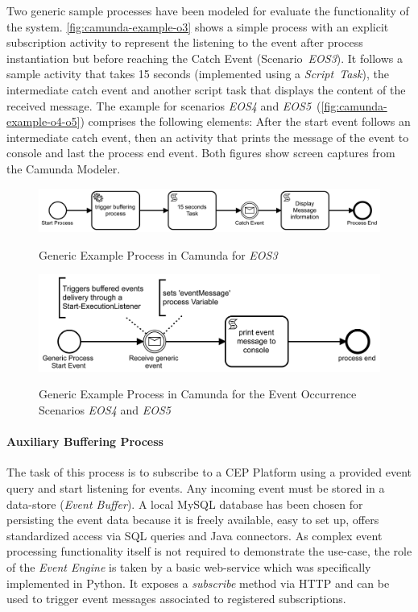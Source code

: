 Two generic sample processes have been modeled for evaluate the functionality of the system. \autoref{fig:camunda-example-o3} shows a simple process with an explicit subscription activity to represent the listening to the event after process instantiation but before reaching the Catch Event (Scenario~\textit{EOS3}). It follows a sample activity that takes 15 seconds (implemented using a \textit{Script~Task}), the intermediate catch event and another script task that displays the content of the received message.
The example for scenarios \textit{EOS4} and \textit{EOS5}~(\autoref{fig:camunda-example-o4-o5}) comprises the following elements: After the start event follows an intermediate catch event, then an activity that prints the message of the event to console and last the process end event. Both figures show screen captures from the Camunda Modeler.

\begin{figure}[]
	\myfloatalign
	{\includegraphics[width=1\linewidth]{chapters/assessment/example-o3.PNG}}
	\caption{Generic Example Process in Camunda for \textit{EOS3}}\label{fig:camunda-example-o3}
\end{figure}

\begin{figure}[]
	\myfloatalign
	{\includegraphics[width=1\linewidth]{chapters/assessment/example-o4-o5.PNG}}
	\caption{Generic Example Process in Camunda for the Event Occurrence Scenarios \textit{EOS4} and \textit{EOS5}}\label{fig:camunda-example-o4-o5}
\end{figure}

\paragraph{Auxiliary Buffering Process}
The task of this process is to subscribe to a CEP Platform using a provided event query and start listening for events. Any incoming event must be stored in a data-store (\textit{Event Buffer}).
A local MySQL database has been chosen for persisting the event data because it is freely available, easy to set up, offers standardized access via SQL queries and Java connectors.
As complex event processing functionality itself is not required to demonstrate the use-case, the role of the \textit{Event Engine} is taken by a basic web-service which was specifically implemented in Python. It exposes a \textit{subscribe} method via \acs{HTTP} and can be used to trigger event messages associated to registered subscriptions.

